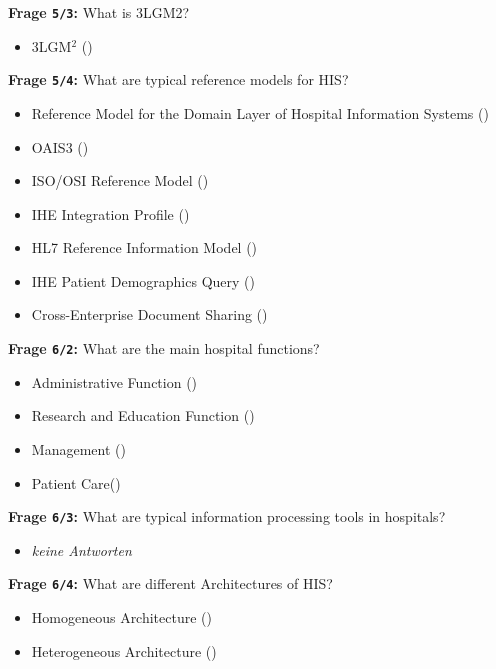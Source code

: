 \textbf{Frage \texttt{5/3}:} What is 3LGM2?

\begin{itemize}
  \item 3LGM$^{2}$ ()
\end{itemize}

\textbf{Frage \texttt{5/4}:} What are typical reference models for HIS?

\begin{itemize}
  \item Reference Model for the Domain Layer of Hospital Information Systems ()
  \item OAIS3 ()
  \item ISO/OSI Reference Model ()
  \item IHE Integration Profile ()
  \item HL7 Reference Information Model ()
  \item IHE Patient Demographics Query ()
  \item Cross-Enterprise Document Sharing ()
\end{itemize}

\textbf{Frage \texttt{6/2}:} What are the main hospital functions?

\begin{itemize}
  \item Administrative Function ()
  \item Research and Education Function ()
  \item Management ()
  \item Patient Care()
\end{itemize}

\textbf{Frage \texttt{6/3}:} What are typical information processing tools in hospitals?

\begin{itemize}
  \item \emph{keine Antworten}
\end{itemize}

\textbf{Frage \texttt{6/4}:} What are different Architectures of HIS?

\begin{itemize}
  \item Homogeneous Architecture ()
  \item Heterogeneous Architecture ()
\end{itemize}


